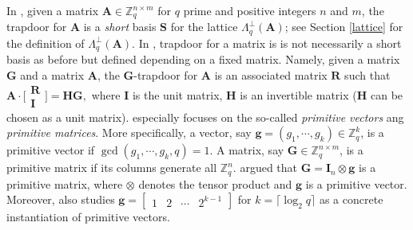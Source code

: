 \documentclass[runningheads]{llncs}
\begin{document}
\iffalse
In \cite{GPV08}, given a matrix $\mathbf{A} \in \mathbb{Z}_q^{n \times m}$ for $q$ prime and positive integers $n$ and $m$, the trapdoor for $\mathbf{A}$ is a \textit{short} basis $\mathbf{S}$ for the lattice $\Lambda_q^{\bot}(\mathbf{A})$; see Section \ref{lattice} for the definition of $\Lambda_q^{\bot}(\mathbf{A})$. In \cite{MP12}, trapdoor for a matrix is is not necessarily a short basis as before but defined depending on a fixed matrix. Namely, given a matrix $\textbf{G}$ and a matrix $\textbf{A}$, the $\textbf{G}$-trapdoor for \textbf{A} is  an associated matrix $\textbf{R}$ such that  $\mathbf{A}\cdot \bigl[ \begin{smallmatrix}
   \mathbf{R}\\ \mathbf{I}
 \end{smallmatrix} \bigr]=\mathbf{H}\mathbf{G},$ where $\textbf{I}$ is the unit matrix, $\textbf{H}$ is an invertible matrix ($\textbf{H}$ can be chosen  as a unit matrix). \cite{MP12} especially focuses on the so-called \textit{primitive vectors} ang \textit{primitive matrices}. More specifically, a vector, say  $\textbf{g}=(g_1, \cdots, g_k)\in \mathbb{Z}_q^{k}$, is a primitive vector if $\gcd(g_1, \cdots, g_k, q)=1$. A matrix, say $\mathbf{G} \in \mathbb{Z}_q^{n \times m}$, is a primitive matrix if its columns generate all $\mathbb{Z}_q^{n}$.  \cite{MP12} argued that $\mathbf{G}=\mathbf{I}_n\otimes \textbf{g}$ is a primitive matrix, where $\otimes$ denotes the tensor product and $\textbf{g}$ is a primitive vector. Moreover, \cite{MP12} also studies $\textbf{g}=\begin{bmatrix}
   1& 2&\cdots& 2^{k-1} 
   \end{bmatrix}$ for $k=\lceil \log_2q \rceil$ as a concrete instantiation of primitive vectors.
   
\end{document}
